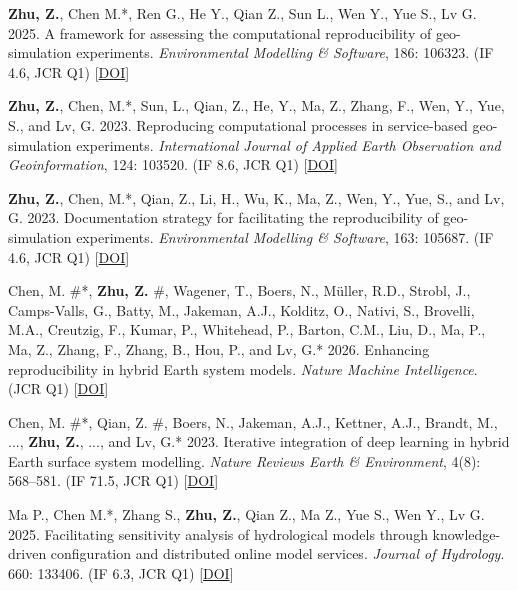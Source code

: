 \documentclass[a4paper,11pt]{article}
\begin{document}
\begin{etaremune}[leftmargin=0.3in]
    \vspace{1pt} \item \textbf{Zhu, Z.}, Chen M.*, Ren G., He Y., Qian Z., Sun L., Wen Y., Yue S., Lv G. 2025. A framework for assessing the computational reproducibility of geo-simulation experiments. \textit{Environmental Modelling \& Software}, 186: 106323. (IF 4.6, JCR Q1) [\href{https://doi.org/10.1016/j.envsoft.2025.106323}{DOI}]

    \vspace{1pt} \item \textbf{Zhu, Z.}, Chen, M.*, Sun, L., Qian, Z., He, Y., Ma, Z., Zhang, F., Wen, Y., Yue, S., and Lv, G. 2023. Reproducing computational processes in service-based geo-simulation experiments. \textit{International Journal of Applied Earth Observation and Geoinformation}, 124: 103520. (IF 8.6, JCR Q1) [\href{https://doi.org/10.1016/j.jag.2023.103520}{DOI}]

    \vspace{1pt} \item \textbf{Zhu, Z.}, Chen, M.*, Qian, Z., Li, H., Wu, K., Ma, Z., Wen, Y., Yue, S., and Lv, G. 2023. Documentation strategy for facilitating the reproducibility of geo-simulation experiments. \textit{Environmental Modelling \& Software}, 163: 105687. (IF 4.6, JCR Q1) [\href{https://doi.org/10.1016/j.envsoft.2023.105687}{DOI}]

    \vspace{1pt} \item Chen, M. \#*, \textbf{Zhu, Z.} \#, Wagener, T., Boers, N., M\"uller, R.D., Strobl, J., Camps-Valls, G., Batty, M., Jakeman, A.J., Kolditz, O., Nativi, S., Brovelli, M.A., Creutzig, F., Kumar, P., Whitehead, P., Barton, C.M., Liu, D., Ma, P., Ma, Z., Zhang, F., Zhang, B., Hou, P., and Lv, G.* 2026. Enhancing reproducibility in hybrid Earth system models. \textit{Nature Machine Intelligence}. (JCR Q1) [\href{https://doi.org/10.1038/s42256-026-01299-5}{DOI}]

    \vspace{1pt} \item Chen, M. \#*, Qian, Z. \#, Boers, N., Jakeman, A.J., Kettner, A.J., Brandt, M., ..., \textbf{Zhu, Z.}, ..., and Lv, G.* 2023. Iterative integration of deep learning in hybrid Earth surface system modelling. \textit{Nature Reviews Earth \& Environment}, 4(8): 568--581. (IF 71.5, JCR Q1) [\href{https://doi.org/10.1038/s43017-023-00452-7}{DOI}]

    \vspace{1pt} \item Ma P., Chen M.*, Zhang S., \textbf{Zhu, Z.}, Qian Z., Ma Z., Yue S., Wen Y., Lv G. 2025. Facilitating sensitivity analysis of hydrological models through knowledge-driven configuration and distributed online model services. \textit{Journal of Hydrology}. 660: 133406. (IF 6.3, JCR Q1) [\href{https://doi.org/10.1016/j.jhydrol.2025.133406}{DOI}]


\end{etaremune}
\end{document}
